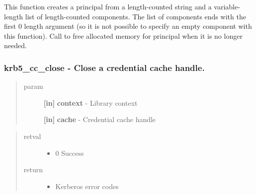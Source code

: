 \documentclass[letterpaper,10pt,english]{sphinxmanual}
\begin{document}
This function creates a principal from a length-counted string and a variable-length list of length-counted components. The list of components ends with the first 0 length argument (so it is not possible to specify an empty component with this function). Call {\hyperref[appdev/refs/api/krb5_free_principal:krb5_free_principal]{}} to free allocated memory for principal when it is no longer needed.


\subsubsection{krb5\_cc\_close -  Close a credential cache handle.}
\label{appdev/refs/api/krb5_cc_close:krb5-cc-close-close-a-credential-cache-handle}\label{appdev/refs/api/krb5_cc_close::doc}

\begin{fulllineitems}
\label{appdev/refs/api/krb5_cc_close:krb5_cc_close}
\end{fulllineitems}

\begin{quote}\begin{description}
\item[{param}] \leavevmode
\textbf{{[}in{]}} \textbf{context} - Library context

\textbf{{[}in{]}} \textbf{cache} - Credential cache handle

\end{description}\end{quote}
\begin{quote}\begin{description}
\item[{retval}] \leavevmode\begin{itemize}
\item {} 
0   Success

\end{itemize}

\item[{return}] \leavevmode\begin{itemize}
\item {} 
Kerberos error codes

\end{itemize}

\end{description}\end{quote}
\end{document}
